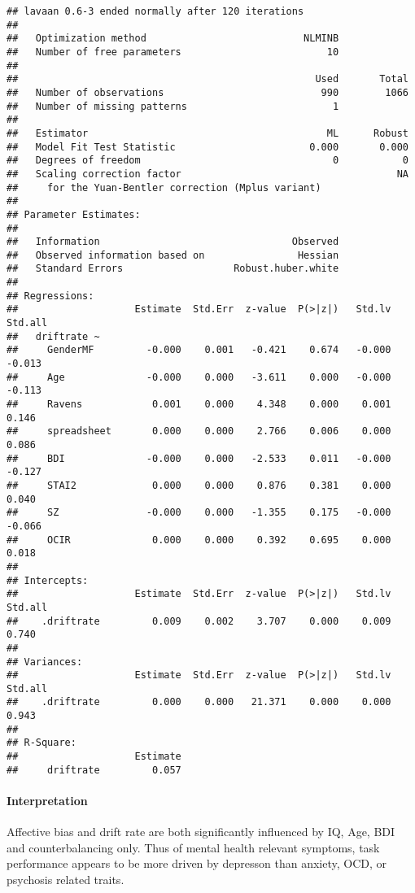 \documentclass[]{article}
\let\oldparagraph\paragraph
\renewcommand{\paragraph}[1]{\oldparagraph{#1}\mbox{}}
\begin{document}
\begin{verbatim}
## lavaan 0.6-3 ended normally after 120 iterations
## 
##   Optimization method                           NLMINB
##   Number of free parameters                         10
## 
##                                                   Used       Total
##   Number of observations                           990        1066
##   Number of missing patterns                         1
## 
##   Estimator                                         ML      Robust
##   Model Fit Test Statistic                       0.000       0.000
##   Degrees of freedom                                 0           0
##   Scaling correction factor                                     NA
##     for the Yuan-Bentler correction (Mplus variant)
## 
## Parameter Estimates:
## 
##   Information                                 Observed
##   Observed information based on                Hessian
##   Standard Errors                   Robust.huber.white
## 
## Regressions:
##                    Estimate  Std.Err  z-value  P(>|z|)   Std.lv  Std.all
##   driftrate ~                                                           
##     GenderMF         -0.000    0.001   -0.421    0.674   -0.000   -0.013
##     Age              -0.000    0.000   -3.611    0.000   -0.000   -0.113
##     Ravens            0.001    0.000    4.348    0.000    0.001    0.146
##     spreadsheet       0.000    0.000    2.766    0.006    0.000    0.086
##     BDI              -0.000    0.000   -2.533    0.011   -0.000   -0.127
##     STAI2             0.000    0.000    0.876    0.381    0.000    0.040
##     SZ               -0.000    0.000   -1.355    0.175   -0.000   -0.066
##     OCIR              0.000    0.000    0.392    0.695    0.000    0.018
## 
## Intercepts:
##                    Estimate  Std.Err  z-value  P(>|z|)   Std.lv  Std.all
##    .driftrate         0.009    0.002    3.707    0.000    0.009    0.740
## 
## Variances:
##                    Estimate  Std.Err  z-value  P(>|z|)   Std.lv  Std.all
##    .driftrate         0.000    0.000   21.371    0.000    0.000    0.943
## 
## R-Square:
##                    Estimate
##     driftrate         0.057
\end{verbatim}

\paragraph{Interpretation}\label{interpretation-1}

Affective bias and drift rate are both significantly influenced by IQ,
Age, BDI and counterbalancing only. Thus of mental health relevant
symptoms, task performance appears to be more driven by depresson than
anxiety, OCD, or psychosis related traits.
\end{document}
